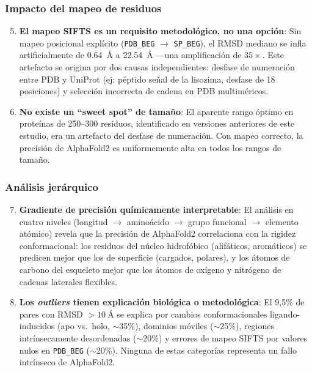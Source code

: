 \subsubsection{Impacto del mapeo de residuos}

\begin{enumerate}
    \setcounter{enumi}{4}
    \item \textbf{El mapeo SIFTS es un requisito metodol\'ogico, no una opci\'on}:
    Sin mapeo posicional expl\'icito (\texttt{PDB\_BEG} $\rightarrow$ \texttt{SP\_BEG}),
    el RMSD mediano se infla artificialmente de \SI{0,64}{\angstrom} a
    \SI{22,54}{\angstrom} ---una amplificaci\'on de $35\times$. Este artefacto se origina
    por dos causas independientes: desfase de numeraci\'on entre PDB y UniProt
    (ej: p\'eptido se\~nal de la lisozima, desfase de 18 posiciones) y selecci\'on
    incorrecta de cadena en PDB multim\'ericos.

    \item \textbf{No existe un ``sweet spot'' de tama\~no}:
    El aparente rango \'optimo en prote\'inas de 250--300 residuos, identificado en
    versiones anteriores de este estudio, era un artefacto del desfase de numeraci\'on.
    Con mapeo correcto, la precisi\'on de AlphaFold2 es uniformemente alta en todos
    los rangos de tama\~no.
\end{enumerate}

\subsubsection{An\'alisis jer\'arquico}

\begin{enumerate}
    \setcounter{enumi}{6}
    \item \textbf{Gradiente de precisi\'on qu\'imicamente interpretable}:
    El an\'alisis en cuatro niveles (longitud $\to$ amino\'acido $\to$ grupo funcional
    $\to$ elemento at\'omico) revela que la precisi\'on de AlphaFold2 correlaciona con
    la rigidez conformacional: los residuos del n\'ucleo hidrofóbico (alif\'aticos,
    arom\'aticos) se predicen mejor que los de superficie (cargados, polares), y los
    \'atomos de carbono del esqueleto mejor que los \'atomos de ox\'igeno y nitr\'ogeno
    de cadenas laterales flexibles.

    \item \textbf{Los \textit{outliers} tienen explicaci\'on biol\'ogica o metodol\'ogica}:
    El 9,5\% de pares con RMSD $> \SI{10}{\angstrom}$ se explica por cambios
    conformacionales ligando-inducidos (apo vs.\ holo, $\sim$35\%), dominios m\'oviles
    ($\sim$25\%), regiones intr\'insecamente desordenadas ($\sim$20\%) y errores de
    mapeo SIFTS por valores nulos en \texttt{PDB\_BEG} ($\sim$20\%). Ninguna de
    estas categor\'ias representa un fallo intr\'inseco de AlphaFold2.
\end{enumerate}

